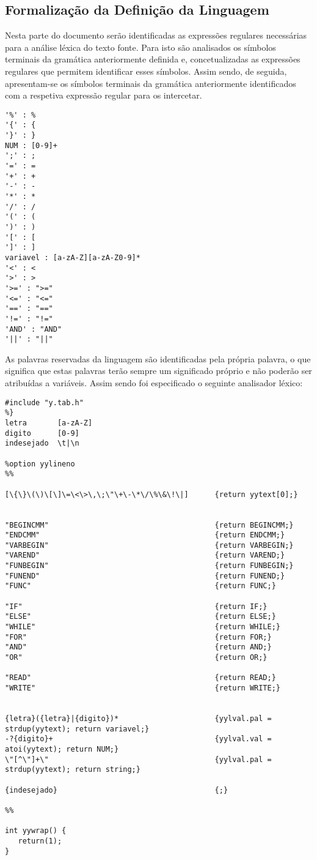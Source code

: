 \documentclass{report}
\begin{document}
\subsection{Formalização da Definição da Linguagem}
Nesta parte do documento serão identificadas as expressões regulares necessárias para a análise léxica do texto fonte. Para isto são analisados os símbolos terminais da gramática anteriormente definida e, concetualizadas as expressões regulares que permitem identificar esses símbolos. 
Assim sendo, de seguida, apresentam-se os símbolos terminais da gramática anteriormente identificados com a respetiva expressão regular para os intercetar.
\begin{verbatim}
'%' : %
'{' : {
'}' : }
NUM : [0-9]+
';' : ;
'=' : =
'+' : +
'-' : -
'*' : *
'/' : /
'(' : (
')' : )
'[' : [
']' : ]
variavel : [a-zA-Z][a-zA-Z0-9]*
'<' : < 
'>' : >
'>=' : ">="
'<=' : "<="
'==' : "=="
'!=' : "!="
'AND' : "AND"
'||' : "||"
\end{verbatim}

As palavras reservadas da linguagem são identificadas pela própria palavra, o que significa que estas palavras terão sempre um significado próprio e não poderão ser atribuídas a variáveis.
Assim sendo foi especificado o seguinte analisador léxico:

\begin{verbatim}
#include "y.tab.h"
%}
letra       [a-zA-Z]
digito      [0-9]
indesejado  \t|\n

%option yylineno
%%

[\{\}\(\)\[\]\=\<\>\,\;\"\+\-\*\/\%\&\!\|]      {return yytext[0];}


"BEGINCMM"				                        {return BEGINCMM;}
"ENDCMM"				                        {return ENDCMM;}
"VARBEGIN"				                        {return VARBEGIN;}
"VAREND"				                        {return VAREND;}
"FUNBEGIN"				                        {return FUNBEGIN;}
"FUNEND"				                        {return FUNEND;}
"FUNC"					                        {return FUNC;}

"IF"					                        {return IF;}
"ELSE"					                        {return ELSE;}
"WHILE"					                        {return WHILE;}
"FOR"					                        {return FOR;}
"AND"											{return AND;}
"OR"											{return OR;}

"READ"					                        {return READ;}
"WRITE"					                        {return WRITE;}


{letra}({letra}|{digito})*                      {yylval.pal = strdup(yytext); return variavel;}
-?{digito}+ 				                    {yylval.val = atoi(yytext); return NUM;}
\"[^\"]+\"										{yylval.pal = strdup(yytext); return string;}

{indesejado}                                    {;}

%%

int yywrap() {
   return(1);
}
\end{verbatim}
\end{document}
